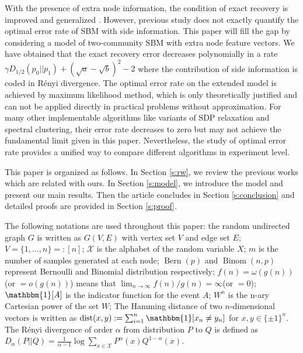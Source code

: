 \documentclass[conference]{IEEEtran}
\DeclareMathOperator{\dist}{dist}
\DeclareMathOperator{\Bern}{Bern}
\DeclareMathOperator{\Binom}{Binom}
\begin{document}
With the presence of extra node information, the condition of exact recovery is improved
and generalized \cite{saad2018community}. However, previous study does not exactly quantify the optimal error rate of SBM with side information. This paper will fill the gap by considering a model of two-community SBM with extra node feature vectors. We have obtained that
the exact recovery error decreases polynomially in a rate $\gamma D_{1/2}(p_0 || p_1) + (\sqrt{a} - \sqrt{b})^2 -2$
where the contribution of side information is coded in Rényi divergence.
The optimal error rate on the extended model is achieved by maximum likelihood method, which is only theoretically justified and can not be applied directly in practical problems without approximation. For many other implementable algorithms like variants of SDP relaxation and
spectral clustering, their error rate decreases to zero but may not achieve the fundamental limit given in this paper. Nevertheless, the study of optimal error rate provides a unified way to compare
different algorithms in experiment level.



This paper is organized as follows. In Section \ref{s:rw}, we review the previous works which are related with ours.
In Section \ref{s:model}, we introduce the model and present our main results.
Then the article concludes in Section \ref{s:conclusion} and
detailed proofs are provided in Section \ref{s:proof}.

The following notations are used throughout this paper: 
the random undirected graph $G$ is written as $G(V,E)$ with vertex set $V$ and edge set $E$;
$V=\{1,\dots, n\} =: [n]$;
$\mathcal{X}$ is the alphabet
of the random variable $X$; $m$ is the number of samples generated at each node;
$\Bern(p)$ and $\Binom(n,p)$ represent Bernoulli
and Binomial distribution respectively; $f(n)=\omega(g(n))$(or $=o(g(n))$) means that $\lim_{n\to \infty} f(n) / g(n) = \infty $(or $=0$);
$\mathbbm{1}[A]$ is the indicator function for the event $A$; $W^n$ is the n-ary Cartesian power of the set $W$;
The Hamming distance of 
two $n$-dimensional vectors is written as $\dist(x,y):=\sum_{i=1}^n \mathbbm{1}[x_n\neq y_n]$ for $x,y\in \{\pm 1 \}^n$. The Rényi divergence of order $\alpha$ from distribution $P$ to $Q$ is defined
as $D_{\alpha}(P||Q) = \frac{1}{\alpha - 1} \log \sum_{x\in \mathcal{X}} P^{\alpha}(x)Q^{1-\alpha}(x) $.
\end{document}
